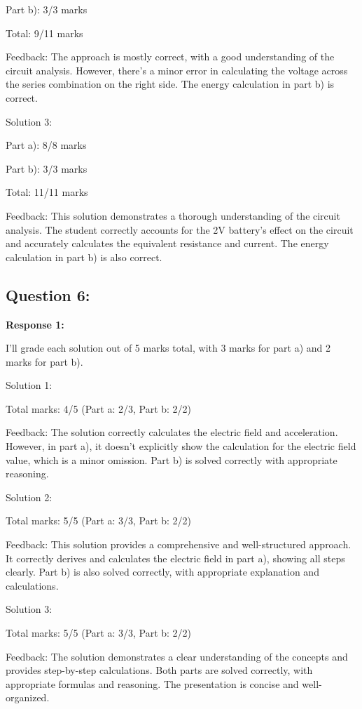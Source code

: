 \documentclass[a4paper,11pt]{article}
\begin{document}
Part b): 3/3 marks

Total: 9/11 marks

Feedback: The approach is mostly correct, with a good understanding of the circuit analysis. However, there's a minor error in calculating the voltage across the series combination on the right side. The energy calculation in part b) is correct.

Solution 3:

Part a): 8/8 marks

Part b): 3/3 marks

Total: 11/11 marks

Feedback: This solution demonstrates a thorough understanding of the circuit analysis. The student correctly accounts for the 2V battery's effect on the circuit and accurately calculates the equivalent resistance and current. The energy calculation in part b) is also correct.

\subsection*{Question 6:}

\textbf{Response 1:}

I'll grade each solution out of 5 marks total, with 3 marks for part a) and 2 marks for part b).

Solution 1:

Total marks: 4/5 (Part a: 2/3, Part b: 2/2)

Feedback: The solution correctly calculates the electric field and acceleration. However, in part a), it doesn't explicitly show the calculation for the electric field value, which is a minor omission. Part b) is solved correctly with appropriate reasoning.

Solution 2:

Total marks: 5/5 (Part a: 3/3, Part b: 2/2)

Feedback: This solution provides a comprehensive and well-structured approach. It correctly derives and calculates the electric field in part a), showing all steps clearly. Part b) is also solved correctly, with appropriate explanation and calculations.

Solution 3:

Total marks: 5/5 (Part a: 3/3, Part b: 2/2)

Feedback: The solution demonstrates a clear understanding of the concepts and provides step-by-step calculations. Both parts are solved correctly, with appropriate formulas and reasoning. The presentation is concise and well-organized.
\end{document}
